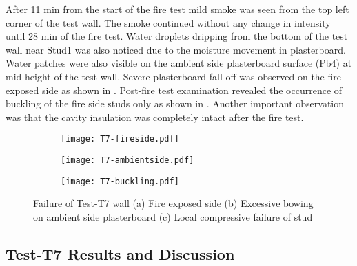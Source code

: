 After 11 min from the start of the fire test mild smoke was seen from the top left corner of the test wall. The smoke continued without any change in  intensity until 28 min of the fire test. Water droplets dripping from the bottom of the test wall near Stud1 was also noticed due to the moisture movement in plasterboard. Water patches were also visible on the ambient side plasterboard surface (Pb4) at mid-height of the test wall. Severe plasterboard fall-off was observed on the fire exposed side as shown in . Post-fire test examination revealed the occurrence of buckling of the fire side studs only as shown in . Another important observation was that the cavity insulation was completely intact after the fire test. 
\begin{figure}[!htbp]
	\centering
	\begin{subfigure}[b]{0.3\textwidth}
		\centering
		\texttt{[image: T7-fireside.pdf]}
		\caption{}
		\label{subfig:T7-fireside}
	\end{subfigure}
	\begin{subfigure}[b]{0.3\textwidth}
		\centering
		\texttt{[image: T7-ambientside.pdf]}
		\caption{}
		\label{subfig:T7-ambientside}
	\end{subfigure}
	\begin{subfigure}[b]{0.3\textwidth}
		\centering
		\texttt{[image: T7-buckling.pdf]}
		\caption{}
		\label{subfig:T7-buckling}
	\end{subfigure}
	   \caption{Failure of Test-T7 wall (a) Fire exposed side (b) Excessive bowing on ambient side plasterboard (c) Local compressive failure of stud}
	   \label{fig:T7-failure}
\end{figure}

\subsection{Test-T7 Results and Discussion}

